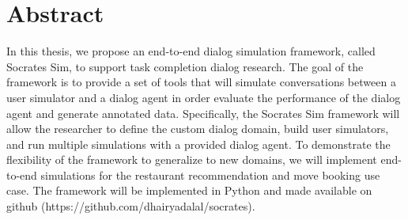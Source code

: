 \chapter*{Abstract}
\thispagestyle{empty}	%

In this thesis, we propose an end-to-end dialog simulation framework, called Socrates Sim, to support task completion dialog research. The goal of the framework is to provide a set of tools that will simulate conversations between a user simulator and a dialog agent in order evaluate the performance of the dialog agent and generate annotated data. Specifically, the Socrates Sim framework will allow the researcher to define the custom dialog domain, build user simulators, and run multiple simulations with a provided dialog agent. To demonstrate the flexibility of the framework to generalize to new domains, we will implement end-to-end simulations for the restaurant recommendation and move booking use case. The framework will be implemented in Python and made available on github (https://github.com/dhairyadalal/socrates). 

